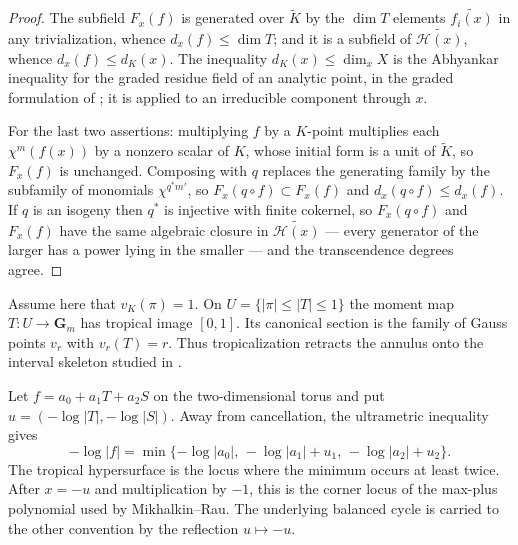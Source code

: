 \begin{proof}
The subfield $F_x(f)$ is generated over $\widetilde K$ by the $\dim T$
elements $\widetilde{f_i(x)}$ in any trivialization, whence
$d_x(f)\le\dim T$; and it is a subfield of $\widetilde{\mathcal H(x)}$,
whence $d_x(f)\le d_K(x)$. The inequality $d_K(x)\le\dim_xX$ is the
Abhyankar inequality for the graded residue field of an analytic point, in
the graded formulation of ; it is
 applied to an irreducible component through
$x$.

For the last two assertions: multiplying $f$ by a $K$-point multiplies each
$\chi^m(f(x))$ by a nonzero scalar of $K$, whose initial form is a unit of
$\widetilde K$, so $F_x(f)$ is unchanged. Composing with $q$ replaces the
generating family by the subfamily of monomials $\chi^{q^*m'}$, so
$F_x(q\circ f)\subset F_x(f)$ and $d_x(q\circ f)\le d_x(f)$. If $q$ is
an isogeny then $q^*$ is injective with finite cokernel, so $F_x(q\circ f)$
and $F_x(f)$ have the same algebraic closure in
$\widetilde{\mathcal H(x)}$ --- every generator of the larger has a power
lying in the smaller --- and the transcendence degrees agree.
\end{proof}

\begin{example}
\label{ex:trop-annulus}
Assume here that $v_K(\pi)=1$.  On
$U=\{|\pi|\leq|T|\leq1\}$ the moment map $T:U\to\mathbf G_m$ has tropical
image $[0,1]$. Its canonical section is the family of Gauss points $v_r$ with
$v_r(T)=r$. Thus tropicalization retracts the annulus onto the interval
skeleton studied in .
\end{example}

\begin{example}
\label{ex:trop-max-min}
Let $f=a_0+a_1T+a_2S$ on the two-dimensional torus and put
$u=(-\log|T|,-\log|S|)$.  Away from cancellation, the ultrametric inequality
gives
\[
 -\log|f|
 =\min\{-\log|a_0|,\,-\log|a_1|+u_1,\,
                       -\log|a_2|+u_2\}.
\]
The tropical hypersurface is the locus where the minimum occurs at least
twice.  After $x=-u$ and multiplication by $-1$, this is the corner locus of
the max-plus polynomial used by Mikhalkin--Rau.  The underlying balanced
cycle is carried to the other convention by the reflection $u\mapsto-u$.
\end{example}


